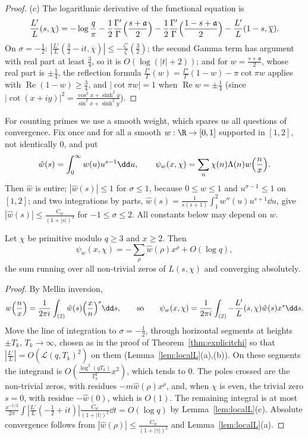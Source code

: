 \begin{proof}
(c) The logarithmic derivative of the functional equation is
\[
\frac{L'}L(s,\chi)=-\log\frac q\pi-\frac12\frac{\Gamma'}\Gamma\Bigl(\frac{s+\mathfrak a}2\Bigr)-\frac12\frac{\Gamma'}\Gamma\Bigl(\frac{1-s+\mathfrak a}2\Bigr)-\frac{L'}L(1-s,\overline\chi).
\]
On $\sigma=-\frac12$: $|\frac{L'}L(\frac32-it,\overline\chi)|\le-\frac{\zeta'}\zeta(\frac32)$; the second Gamma term has argument with real part at least $\frac34$, so it is $O(\log(|t|+2))$; and for $w=\frac{s+\mathfrak a}2$, whose real part is $\pm\frac14$, the reflection formula $\frac{\Gamma'}\Gamma(w)=\frac{\Gamma'}\Gamma(1-w)-\pi\cot\pi w$ applies with $\operatorname{Re}(1-w)\ge\frac34$, and $|\cot\pi w|=1$ when $\operatorname{Re}w=\pm\frac14$ (since $|\cot(x+iy)|^2=\frac{\cos^2x+\sinh^2y}{\sin^2x+\sinh^2y}$).
\end{proof}

For counting primes we use a smooth weight, which spares us all questions of convergence. Fix once and for all a smooth $w:\R\to[0,1]$ supported in $[1,2]$, not identically $0$, and put
\[
\hat w(s)=\int_0^\infty w(u)u^{s-1}\dd u,\qquad\psi_w(x,\chi)=\sum_n\chi(n)\Lambda(n)w\Bigl(\frac nx\Bigr).
\]
Then $\hat w$ is entire; $|\hat w(s)|\le1$ for $\sigma\le1$, because $0\le w\le1$ and $u^{\sigma-1}\le1$ on $[1,2]$; and two integrations by parts, $\hat w(s)=\frac1{s(s+1)}\int_1^2w''(u)u^{s+1}\dd u$, give $|\hat w(s)|\le\frac{C_w}{(1+|s|)^2}$ for $-1\le\sigma\le2$. All constants below may depend on $w$.

\begin{proposition}\label{prop:smoothexplicit}
Let $\chi$ be primitive modulo $q\ge3$ and $x\ge2$. Then
\[
\psi_w(x,\chi)=-\sum_\rho\hat w(\rho)x^\rho+O(\log q),
\]
the sum running over all non-trivial zeros of $L(s,\chi)$ and converging absolutely.
\end{proposition}
\begin{proof}
By Mellin inversion,
\[
w\Bigl(\frac nx\Bigr)=\frac1{2\pi i}\int_{(2)}\hat w(s)\Bigl(\frac xn\Bigr)^s\dd s,\qquad\text{so}\qquad\psi_w(x,\chi)=\frac1{2\pi i}\int_{(2)}-\frac{L'}L(s,\chi)\hat w(s)x^s\dd s.
\]
Move the line of integration to $\sigma=-\frac12$, through horizontal segments at heights $\pm T_k$, $T_k\to\infty$, chosen as in the proof of Theorem~\ref{thm:explicitchi} so that $|\frac{L'}L|=O(\mathcal L(q,T_k)^2)$ on them (Lemma~\ref{lem:localL}(a),(b)). On these segments the integrand is $O(\frac{\log^2(qT_k)}{T_k^2}x^2)$, which tends to $0$. The poles crossed are the non-trivial zeros, with residues $-m\hat w(\rho)x^\rho$, and, when $\chi$ is even, the trivial zero $s=0$, with residue $-\hat w(0)$, which is $O(1)$. The remaining integral is at most $\frac{x^{-1/2}}{2\pi}\int|\frac{L'}L(-\frac12+it)|\frac{C_w}{(1+|t|)^2}\dd t=O(\log q)$ by Lemma~\ref{lem:localL}(c). Absolute convergence follows from $|\hat w(\rho)|\le\frac{C_w}{(1+|\gamma|)^2}$ and Lemma~\ref{lem:localL}(a).
\end{proof}

